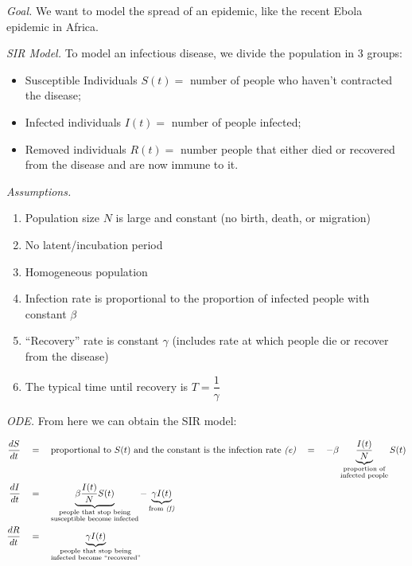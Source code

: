 \emph{Goal.} We want to model the spread of an epidemic, like the recent Ebola epidemic in Africa.

\vfill


\emph{SIR Model.} To model an infectious disease, we divide the population in 3 groups:
\begin{itemize}
\item Susceptible Individuals $S(t) = $ number of people who haven't contracted the disease;
\item Infected individuals $I(t)= $ number of people infected;
\item Removed individuals $R(t)=$ number people that either died or recovered from the disease and are now immune to it.
\end{itemize}

\vfill

\emph{Assumptions.} 

\begin{enumerate}[label=\emph{(\alph*)}] 
\item Population size $N$ is large and constant (no birth, death, or migration)
\item No latent/incubation period
\item Homogeneous population
\item Infection rate is proportional to the proportion of infected people with constant $\beta$
\item ``Recovery'' rate is constant $\gamma$ (includes rate at which people die or recover from the disease)
\item The typical time until recovery is $T = \dfrac{1}{\gamma}$
\end{enumerate}

\vfill

\emph{ODE. } From here we can obtain the SIR model:

\begin{emphbox}[]
\begin{align*}
\frac{dS}{dt} \quad & = \quad \text{proportional to $S(t)$ and the constant is the infection rate \emph{(e)}} 
	 \quad = \quad  - \beta \underbrace{\frac{I(t)}{N}}_{\substack{\text{proportion of}\\\text{infected people}}}S(t) \\
\frac{dI}{dt} \quad & = \quad \underbrace{\beta \frac{I(t)}{N} S(t)}_{\substack{\text{people that stop being}\\ \text{susceptible become infected}}} - \underbrace{\gamma I(t)}_{\text{from \emph{(f)}}} \\
\frac{dR}{dt} \quad & = \quad \underbrace{\gamma I(t)}_{\substack{\text{people that stop being}\\ \text{infected become ``recovered''}}}
\end{align*}
\end{emphbox}



